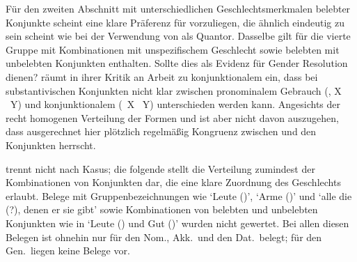 Für den zweiten Abschnitt mit unterschiedlichen Geschlechtsmerkmalen belebter
Konjunkte scheint eine klare Präferenz für  vorzuliegen, die
ähnlich eindeutig zu sein scheint wie bei der Verwendung von  als
Quantor. Dasselbe gilt für die vierte Gruppe mit Kombinationen mit
unspezifischem Geschlecht sowie belebten mit unbelebten Konjunkten enthalten.
Sollte dies als Evidenz für Gender Resolution dienen? \citet[187]{gjelsten1980}
räumt in ihrer Kritik an  Arbeit zu konjunktionalem
 ein, dass bei substantivischen Konjunkten nicht klar zwischen
pronominalem Gebrauch (, X ~Y) und konjunktionalem
(~X ~Y) unterschieden werden kann. Angesichts der recht
homogenen Verteilung der Formen  und  ist aber nicht
davon auszugehen, dass ausgerechnet hier plötzlich regelmäßig Kongruenz
zwischen  und den Konjunkten herrscht.

 trennt nicht nach Kasus; die folgende
 stellt die Verteilung zumindest der
Kombinationen von Konjunkten dar, die eine klare Zuordnung des Geschlechts
erlaubt. Belege mit Gruppenbezeichnungen wie  `Leute
(\MascA)',  `Arme (\MascA)' und  `alle die (\MascA?), denen er sie gibt' sowie Kombinationen von
belebten und unbelebten Konjunkten wie in  `Leute
(\MascA) und Gut (\NeutI)' wurden nicht gewertet. Bei allen diesen Belegen ist
ohnehin nur  für den Nom., Akk.\ und den Dat.\ belegt; für den
Gen.\ liegen keine Belege vor.

